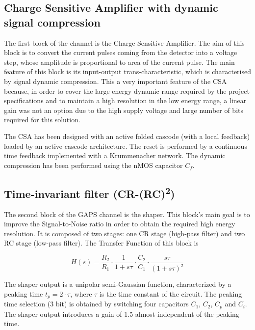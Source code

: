 
\subsection*{Charge Sensitive Amplifier with dynamic signal compression}
The first block of the channel is the Charge Sensitive Amplifier. The aim of this block is to convert the current pulses coming from the detector into a voltage step, whose amplitude is proportional to area of the current pulse. The main feature of this block is its input-output trans-characteristic, which is characterised by signal dynamic compression. This a very important feature of the CSA because, in order to cover the large energy dynamic range required by the project specifications and to maintain a high resolution in the low energy range, a linear gain was not an option due to the high supply voltage and large number of bits required for this solution.

\par
The CSA has been designed with an active folded cascode (with a local feedback) loaded by an active cascode architecture. The reset is performed by a continuous time feedback implemented with a Krummenacher network. The dynamic compression has been performed using the nMOS capacitor $C_f$.


\subsection*{Time-invariant filter (CR-(RC)\textsuperscript{2})}
\label{shaper}
The second block of the GAPS channel is the shaper. This block’s main goal is to improve the Signal-to-Noise ratio in order to obtain the required high energy resolution. It is composed of two stages: one CR stage (high-pass filter) and two RC stage (low-pass filter). The Transfer Function of this block is

\begin{equation}
    H(s) = \frac{R_2}{R_1} \cdot \frac{1}{1+s\tau} \cdot \frac{C_2}{C_1} \cdot \frac{s\tau}{(1+s\tau)^2}
\end{equation}

\noindent
The shaper output is a unipolar semi-Gaussian function, characterized by a peaking time $t_p = 2 \cdot \tau$, where $\tau$ is the time constant of the circuit. The peaking time selection (3 bit) is obtained by switching four capacitors $C_1$, $C_2$, $C_p$ and $C_i$. The shaper output introduces a gain of 1.5 almost independent of the peaking time.

